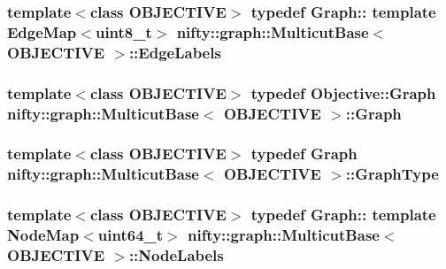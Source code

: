 \subsubsection[{Edge\+Labels}]{\setlength{\rightskip}{0pt plus 5cm}template$<$class O\+B\+J\+E\+C\+T\+I\+V\+E$>$ typedef Graph\+:: template Edge\+Map$<$uint8\+\_\+t$>$ {\bf nifty\+::graph\+::\+Multicut\+Base}$<$ O\+B\+J\+E\+C\+T\+I\+V\+E $>$\+::{\bf Edge\+Labels}}\label{classnifty_1_1graph_1_1MulticutBase_aaeefe3c5df81d9c9efffec878cf2fcd7}
\hypertarget{classnifty_1_1graph_1_1MulticutBase_aed98150a2206d8355fa06f9bda580fdc}{}
\subsubsection[{Graph}]{\setlength{\rightskip}{0pt plus 5cm}template$<$class O\+B\+J\+E\+C\+T\+I\+V\+E$>$ typedef Objective\+::\+Graph {\bf nifty\+::graph\+::\+Multicut\+Base}$<$ O\+B\+J\+E\+C\+T\+I\+V\+E $>$\+::{\bf Graph}}\label{classnifty_1_1graph_1_1MulticutBase_aed98150a2206d8355fa06f9bda580fdc}
\hypertarget{classnifty_1_1graph_1_1MulticutBase_a0c674562b9f64182f2724057102241ab}{}
\subsubsection[{Graph\+Type}]{\setlength{\rightskip}{0pt plus 5cm}template$<$class O\+B\+J\+E\+C\+T\+I\+V\+E$>$ typedef {\bf Graph} {\bf nifty\+::graph\+::\+Multicut\+Base}$<$ O\+B\+J\+E\+C\+T\+I\+V\+E $>$\+::{\bf Graph\+Type}}\label{classnifty_1_1graph_1_1MulticutBase_a0c674562b9f64182f2724057102241ab}
\hypertarget{classnifty_1_1graph_1_1MulticutBase_afba61ad2919d0fad20b3745af19309da}{}
\subsubsection[{Node\+Labels}]{\setlength{\rightskip}{0pt plus 5cm}template$<$class O\+B\+J\+E\+C\+T\+I\+V\+E$>$ typedef Graph\+:: template Node\+Map$<$uint64\+\_\+t$>$ {\bf nifty\+::graph\+::\+Multicut\+Base}$<$ O\+B\+J\+E\+C\+T\+I\+V\+E $>$\+::{\bf Node\+Labels}}\label{classnifty_1_1graph_1_1MulticutBase_afba61ad2919d0fad20b3745af19309da}
\hypertarget{classnifty_1_1graph_1_1MulticutBase_a7d014a4aa2d6e8fa3cd58b70b95ca829}{}
